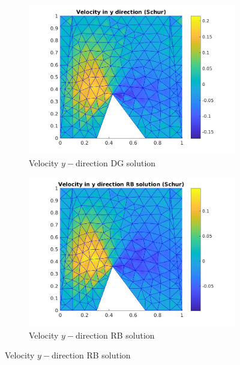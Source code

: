 \documentclass[a4paper,oneside,openright,spanish,english]{book}
\begin{document}
\begin{figure}[t!]
\medskip
\begin{subfigure}{0.48\textwidth}
\includegraphics[width=\linewidth]{offline_velocity_2_at_43_36.jpg}
\caption{Velocity $y-$direction DG solution} \label{vel_y_dg}
\end{subfigure}\hspace*{\fill}
\begin{subfigure}{0.48\textwidth}
\includegraphics[width=\linewidth]{online_velocity_2_at_43_36.jpg}
\caption{Velocity $y-$direction RB solution} \label{vel_y_rb}
\end{subfigure}


\end{figure}
\end{document}
